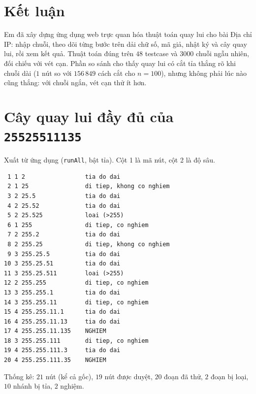 \documentclass[12pt,a4paper]{article}
\begin{document}
\section{Kết luận}

Em đã xây dựng ứng dụng web trực quan hóa thuật toán quay lui cho bài Địa chỉ IP: nhập chuỗi, theo dõi từng bước trên dải chữ số, mã giả, nhật ký và cây quay lui, rồi xem kết quả. Thuật toán đúng trên $48$ testcase và $3000$ chuỗi ngẫu nhiên, đối chiếu với vét cạn. Phần so sánh cho thấy quay lui có cắt tỉa thắng rõ khi chuỗi dài ($1$ nút so với $156\,849$ cách cắt cho $n=100$), nhưng không phải lúc nào cũng thắng: với chuỗi ngắn, vét cạn thử ít hơn.

\appendix
\section{Cây quay lui đầy đủ của \texttt{25525511135}}
Xuất từ ứng dụng (\texttt{runAll}, bật tỉa). Cột 1 là mã nút, cột 2 là độ sâu.
\begin{lstlisting}
 1 1 2                 tia do dai
 2 1 25                di tiep, khong co nghiem
 3 2 25.5              tia do dai
 4 2 25.52             tia do dai
 5 2 25.525            loai (>255)
 6 1 255               di tiep, co nghiem
 7 2 255.2             tia do dai
 8 2 255.25            di tiep, khong co nghiem
 9 3 255.25.5          tia do dai
10 3 255.25.51         tia do dai
11 3 255.25.511        loai (>255)
12 2 255.255           di tiep, co nghiem
13 3 255.255.1         tia do dai
14 3 255.255.11        di tiep, co nghiem
15 4 255.255.11.1      tia do dai
16 4 255.255.11.13     tia do dai
17 4 255.255.11.135    NGHIEM
18 3 255.255.111       di tiep, co nghiem
19 4 255.255.111.3     tia do dai
20 4 255.255.111.35    NGHIEM
\end{lstlisting}
Thống kê: $21$ nút (kể cả gốc), $19$ nút được duyệt, $20$ đoạn đã thử, $2$ đoạn bị loại, $10$ nhánh bị tỉa, $2$ nghiệm.
\end{document}
